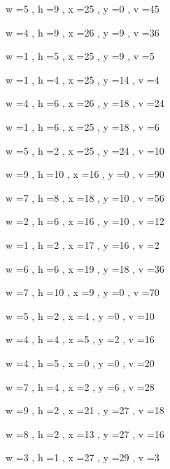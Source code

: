 \documentclass[11pt]{article}
\begin{document}
w =5 , h =9 , x =25 , y =0 , v =45
\par
w =4 , h =9 , x =26 , y =9 , v =36
\par
w =1 , h =5 , x =25 , y =9 , v =5
\par
w =1 , h =4 , x =25 , y =14 , v =4
\par
w =4 , h =6 , x =26 , y =18 , v =24
\par
w =1 , h =6 , x =25 , y =18 , v =6
\par
w =5 , h =2 , x =25 , y =24 , v =10
\par
w =9 , h =10 , x =16 , y =0 , v =90
\par
w =7 , h =8 , x =18 , y =10 , v =56
\par
w =2 , h =6 , x =16 , y =10 , v =12
\par
w =1 , h =2 , x =17 , y =16 , v =2
\par
w =6 , h =6 , x =19 , y =18 , v =36
\par
w =7 , h =10 , x =9 , y =0 , v =70
\par
w =5 , h =2 , x =4 , y =0 , v =10
\par
w =4 , h =4 , x =5 , y =2 , v =16
\par
w =4 , h =5 , x =0 , y =0 , v =20
\par
w =7 , h =4 , x =2 , y =6 , v =28
\par
w =9 , h =2 , x =21 , y =27 , v =18
\par
w =8 , h =2 , x =13 , y =27 , v =16
\par
w =3 , h =1 , x =27 , y =29 , v =3
\par
\newpage
\end{document}
